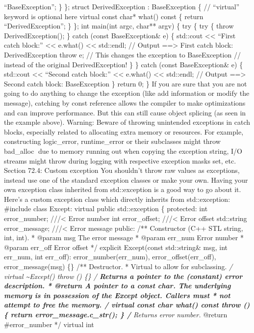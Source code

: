 ``BaseException''; \} \}; struct DerivedException : BaseException \{ //
``virtual'' keyword is optional here virtual const char* what() const \{
return ``DerivedException''; \} \}; int main(int argc, char** argv) \{
try \{ try \{ throw DerivedException(); \} catch (const BaseException\&
e) \{ std::cout \textless\textless{} ``First catch block:''
\textless\textless{} e.what() \textless\textless{} std::endl; // Output
==\textgreater{} First catch block: DerivedException throw e; // This
changes the exception to BaseException // instead of the original
DerivedException! \} \} catch (const BaseException\& e) \{ std::cout
\textless\textless{} ``Second catch block:'' \textless\textless{}
e.what() \textless\textless{} std::endl; // Output ==\textgreater{}
Second catch block: BaseException \} return 0; \} If you are sure that
you are not going to do anything to change the exception (like add
information or modify the message), catching by const reference allows
the compiler to make optimizations and can improve performance. But this
can still cause object splicing (as seen in the example above). Warning:
Beware of throwing unintended exceptions in catch blocks, especially
related to allocating extra memory or resources. For example,
constructing logic\_error, runtime\_error or their subclasses might
throw bad\_alloc due to memory running out when copying the exception
string, I/O streams might throw during logging with respective exception
masks set, etc. Section 72.4: Custom exception You shouldn't throw raw
values as exceptions, instead use one of the standard exception classes
or make your own. Having your own exception class inherited from
std::exception is a good way to go about it. Here's a custom exception
class which directly inherits from std::exception: \#include class
Except: virtual public std::exception \{ protected: int error\_number;
///\textless{} Error number int error\_offset; ///\textless{} Error
offset std::string error\_message; ///\textless{} Error message public:
/** Constructor (C++ STL string, int, int). * @param msg The error
message * @param err\_num Error number * @param err\_off Error offset */
explicit Except(const std::string\& msg, int err\_num, int err\_off):
error\_number(err\_num), error\_offset(err\_off), error\_message(msg)
\{\} /** Destructor. * Virtual to allow for subclassing. \emph{/ virtual
\textasciitilde Except() throw () \{\} /\textbf{ Returns a pointer to
the (constant) error description. * @return A pointer to a const
char\emph{. The underlying memory } is in possession of the Except
object. Callers must * not attempt to free the memory. \emph{/ virtual
const char} what() const throw () \{ return error\_message.c\_str(); \}
/} Returns error number. } @return \#error\_number */ virtual int
